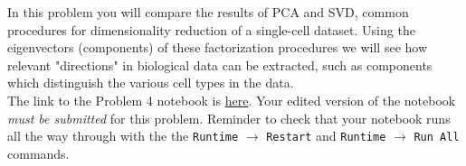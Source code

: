 \documentclass[11pt]{exam}
\begin{document}
\begin{questions}
	

\newpage
\question[50] In this problem you will compare the results of PCA and SVD, common procedures for dimensionality reduction of a single-cell dataset. Using the eigenvectors (components) of these factorization procedures we will see how relevant "directions" in biological data can be extracted, such as components which distinguish the various cell types in the data.\\

The link to the Problem 4 notebook is \href{https://github.com/pachterlab/BI-BE-CS-183-2023/blob/main/HW3/Problem4.ipynb}{here}. Your edited version of the notebook \textit{must be submitted } for this problem. Reminder to check that your notebook runs all the way through with the the {\tt Runtime} $\xrightarrow{}$ {\tt Restart} and {\tt Runtime} $\xrightarrow{}$ {\tt Run All} commands.


\end{questions}
\end{document}

